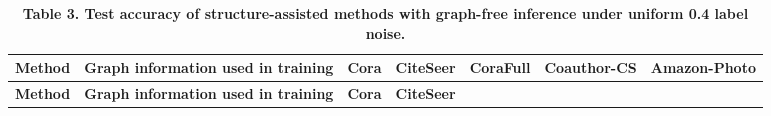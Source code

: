 \begin{longtable}[]{@{}
  >{\raggedright\arraybackslash}p{}
  >{\centering\arraybackslash}p{}
  >{\centering\arraybackslash}p{}
  >{\centering\arraybackslash}p{}
  >{\centering\arraybackslash}p{}
  >{\centering\arraybackslash}p{}
  >{\centering\arraybackslash}p{}@{}}
\caption{\textbf{Table 3. Test accuracy of structure-assisted methods with graph-free inference under uniform 0.4 label noise.}}\tabularnewline
\toprule\noalign{}
\begin{minipage}[b]{\linewidth}\raggedright
\textbf{Method}
\end{minipage} & \begin{minipage}[b]{\linewidth}\centering
\textbf{Graph information used in training}
\end{minipage} & \begin{minipage}[b]{\linewidth}\centering
\textbf{Cora}
\end{minipage} & \begin{minipage}[b]{\linewidth}\centering
\textbf{CiteSeer}
\end{minipage} & \begin{minipage}[b]{\linewidth}\centering
\textbf{CoraFull}
\end{minipage} & \begin{minipage}[b]{\linewidth}\centering
\textbf{Coauthor-CS}
\end{minipage} & \begin{minipage}[b]{\linewidth}\centering
\textbf{Amazon-Photo}
\end{minipage} \\
\midrule\noalign{}
\endfirsthead
\toprule\noalign{}
\begin{minipage}[b]{\linewidth}\raggedright
\textbf{Method}
\end{minipage} & \begin{minipage}[b]{\linewidth}\centering
\textbf{Graph information used in training}
\end{minipage} & \begin{minipage}[b]{\linewidth}\centering
\textbf{Cora}
\end{minipage} & \begin{minipage}[b]{\linewidth}\centering
\textbf{CiteSeer}
\end{minipage} & \begin{minipage}[b]{\linewidth}\centering

\end{minipage}
\end{longtable}
